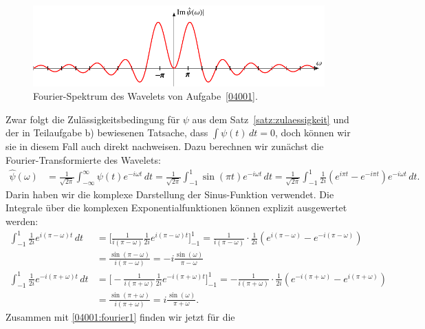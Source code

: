 \begin{loesung}
\begin{teilaufgaben}
\begin{figure}
\includegraphics{uebungsaufgaben/04001-spektrum.pdf}
\caption{Fourier-Spektrum des Wavelets von Aufgabe~\ref{04001}.
\label{04001:spektrum}}
\end{figure}
\item
Zwar folgt die Zulässigkeitsbedingung für $\psi$ aus dem
Satz~\ref{satz:zulaessigkeit} und der in Teilaufgabe b) bewiesenen
Tatsache, dass $\int \psi(t)\,dt=0$, doch können wir sie in diesem Fall
auch direkt nachweisen.
Dazu berechnen wir zunächst die Fourier-Transformierte des Wavelets:
\begin{align}
\hat{\psi}(\omega)
&=
\frac{1}{\sqrt{2\pi}}
\int_{-\infty}^\infty \psi(t)e^{-i\omega t}\,dt
=
\frac{1}{\sqrt{2\pi}}
\int_{-1}^{1} \sin(\pi t)e^{-i\omega t}\,dt
=
\frac{1}{\sqrt{2\pi}}
\int_{-1}^1
\frac1{2i} (e^{i\pi t}-e^{-i\pi t})e^{-i\omega t}\,dt.
\label{04001:fourier1}
\end{align}
Darin haben wir die komplexe Darstellung der Sinus-Funktion verwendet.
Die Integrale über die komplexen Exponentialfunktionen können explizit
ausgewertet werden:
\begin{align*}
\int_{-1}^1 \frac{1}{2i}e^{i(\pi-\omega)t}\,dt
&=
\biggl[
\frac{1}{i(\pi-\omega)}
\frac1{2i}
e^{i(\pi-\omega)t}
\biggr]_{-1}^1
=
\frac{1}{i(\pi-\omega)}
\cdot
\frac1{2i}(e^{i(\pi-\omega)}-e^{-i(\pi-\omega)})
\\
&=
\frac{\sin(\pi-\omega)}{i(\pi-\omega)}
=
-i\frac{\sin(\omega)}{\pi-\omega}
\\
\int_{-1}^1 \frac{1}{2i}e^{-i(\pi+\omega)t}\,dt
&=
\biggl[
-\frac{1}{i(\pi+\omega)}
\frac1{2i}
e^{-i(\pi+\omega)t}
\biggr]_{-1}^1
=
-\frac{1}{i(\pi+\omega)}
\cdot
\frac1{2i}(e^{-i(\pi+\omega)}-e^{i(\pi+\omega)})
\\
&=
\frac{\sin(\pi+\omega)}{i(\pi+\omega)}
=
i\frac{\sin(\omega)}{\pi+\omega}.
\end{align*}
Zusammen mit \eqref{04001:fourier1} finden wir jetzt für die

\end{teilaufgaben}
\end{loesung}
